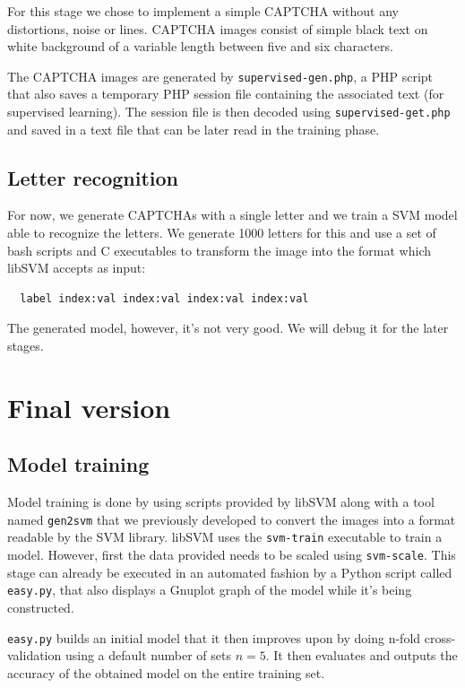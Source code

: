 \documentclass[a4paper,12pt]{article}
\begin{document}
For this stage we chose to implement a simple CAPTCHA without any distortions,
noise or lines. CAPTCHA images consist of simple black text on white
background of a variable length between five and six characters.

The CAPTCHA images are generated by \texttt{supervised-gen.php}, a PHP
script that also saves a temporary PHP session file containing the associated
text (for supervised learning). The session file is then decoded using 
\texttt{supervised-get.php} and saved in a text file that can be later
read in the training phase.

\subsection*{Letter recognition}

For now, we generate CAPTCHAs with a single letter and we train a SVM model
able to recognize the letters. We generate 1000 letters for this and use a set
of bash scripts and C executables to transform the image into the format which
libSVM accepts as input:

\begin{verbatim}
  label index:val index:val index:val index:val
\end{verbatim}

The generated model, however, it's not very good. We will debug it for the
later stages.

\section{Final version}
\label{sec:final}

\subsection*{Model training}

Model training is done by using scripts provided by libSVM along with a tool
named \texttt{gen2svm} that we previously developed to convert the images into
a format readable by the SVM library. libSVM uses the \texttt{svm-train}
executable to train a model. However, first the data provided needs to be
scaled using \texttt{svm-scale}. This stage can already be executed in an
automated fashion by a Python script called \texttt{easy.py}, that also
displays a Gnuplot graph of the model while it's being constructed.

\texttt{easy.py} builds an initial model that it then improves upon by doing
n-fold cross-validation using a default number of sets $n = 5$. It then
evaluates and outputs the accuracy of the obtained model on the entire training
set.
\end{document}
